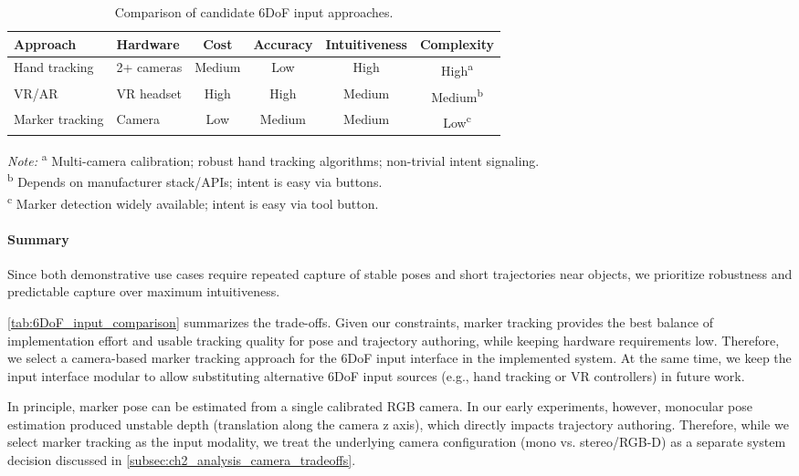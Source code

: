 \begin{table}[t]
\centering
\caption{Comparison of candidate 6DoF input approaches.}
\label{tab:6DoF_input_comparison}

\small 

\begin{tabular}{l l c c c c}
\toprule
Approach & Hardware & Cost & Accuracy & Intuitiveness & Complexity \\
\midrule
Hand tracking &
2+ cameras &
Medium &
Low &
High &
High\textsuperscript{a} \\

VR/AR &
VR headset &
High &
High &
Medium &
Medium\textsuperscript{b} \\

Marker tracking &
Camera &
Low &
Medium &
Medium &
Low\textsuperscript{c} \\
\bottomrule
\end{tabular}

\vspace{0.4em}
\footnotesize
\emph{Note:}
\textsuperscript{a} Multi-camera calibration; robust hand tracking algorithms; non-trivial intent signaling. \\
\textsuperscript{b} Depends on manufacturer stack/APIs; intent is easy via buttons. \\
\textsuperscript{c} Marker detection widely available; intent is easy via tool button.
\end{table}

\paragraph{Summary}
Since both demonstrative use cases require repeated capture of stable poses and short trajectories near objects, we prioritize robustness and predictable capture over maximum intuitiveness.

\autoref{tab:6DoF_input_comparison} summarizes the trade-offs. Given our constraints, marker tracking provides the best balance of implementation effort and usable tracking quality for pose and trajectory authoring, while keeping hardware requirements low. Therefore, we select a camera-based marker tracking approach for the 6DoF input interface in the implemented system. At the same time, we keep the input interface modular to allow substituting alternative 6DoF input sources (e.g., hand tracking or VR controllers) in future work.

In principle, marker pose can be estimated from a single calibrated RGB camera. In our early experiments, however, monocular pose estimation produced unstable depth (translation along the camera z axis), which directly impacts trajectory authoring. Therefore, while we select marker tracking as the input modality, we treat the underlying camera configuration (mono vs. stereo/RGB-D) as a separate system decision discussed in \autoref{subsec:ch2_analysis_camera_tradeoffs}.


